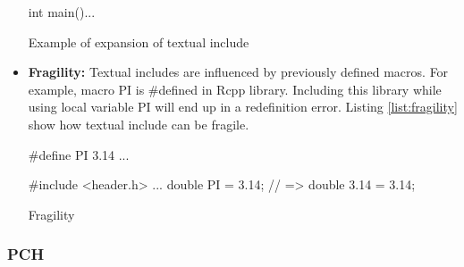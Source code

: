 \documentclass{webofc}
\begin{document}
\begin{itemize}
\begin{listing}[h]
\begin{minipage}[h]{.48\textwidth}
\begin{cppcode*}{}
    int main(){...}
    \end{cppcode*}
    \end{minipage}\hfill
    \begin{minipage}[h]{.48\textwidth}
    \begin{cppcode*}
    # 286 "/usr/include/c++/v1/vector" 2 3
    namespace std { inline namespace __1 {
    template <bool> class __vector_base_common {
       __attribute__ ((__visibility__("hidden"),
       __always_inline__))
       __vector_base_common() {}
    ...
    # 394 "/usr/include/c++/v1/set" 3
    namespace std {inline namespace __1 {
    template <...> class set {
    public:
        typedef _Key key_type;

    int main() {...}
    \end{cppcode*}
    \end{minipage}
    \caption{Example of expansion of textual include}
    \label{list:expansion-of-textual-include}
\end{listing}

    \item \textbf{Fragility:} Textual includes are influenced by previously defined macros.
    For example, macro PI is \#defined in Rcpp library. Including this library while using local variable PI will end up in a redefinition error. Listing \ref{list:fragility} show how textual include can be fragile.
    
\begin{listing}[h]
    \noindent
    \begin{minipage}[h]{.48\textwidth}
    \begin{cppcode*}{}
    #define PI 3.14
    ...
    \end{cppcode*}
    \end{minipage}\hfill
    \begin{minipage}[h]{.48\textwidth}
    \begin{cppcode*}{}
    #include <header.h>
    ...
    double PI = 3.14;
    // => double 3.14 = 3.14;
    \end{cppcode*}
    \end{minipage}
    \caption{Fragility}
    \label{list:fragility}
\end{listing}

\end{itemize}

\subsubsection{PCH}
\end{document}
